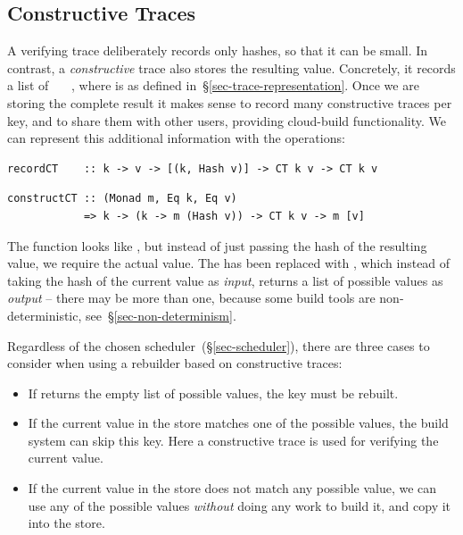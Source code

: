 \subsection{Constructive Traces}\label{sec-constructive-traces}

A verifying trace deliberately records only hashes, so that it can be small. In
contrast, a \emph{constructive} trace also stores the resulting value.
Concretely, it records a list of ~~~, where
 is as defined in~\S\ref{sec-trace-representation}. Once we are
storing the complete result it makes sense to record many constructive traces
per key, and to share them with other users, providing cloud-build
functionality. We can represent this additional information with the operations:

\vspace{1mm}
\begin{verbatim}
recordCT    :: k -> v -> [(k, Hash v)] -> CT k v -> CT k v
\end{verbatim}
\vspace{-2mm}
\begin{verbatim}
constructCT :: (Monad m, Eq k, Eq v)
            => k -> (k -> m (Hash v)) -> CT k v -> m [v]
\end{verbatim}
\vspace{1mm}

\noindent
The function  looks like , but instead of just passing
the hash of the resulting value, we require the actual value. The 
has been replaced with , which instead of taking the hash of the
current value as \emph{input}, returns a list of possible values as
\emph{output} -- there may be more than one, because some build tools are
non-deterministic, see~\S\ref{sec-non-determinism}.

Regardless of the chosen scheduler~(\S\ref{sec-scheduler}), there are three
cases to consider when using a rebuilder based on constructive traces:

\begin{itemize}
  \item If  returns the empty list of possible values, the key
        must be rebuilt.
  \item If the current value in the store matches one of the possible values,
        the build system can skip this key. Here a constructive trace is used
        for verifying the current value.
  \item If the current value in the store does not match any possible value, we
        can use any of the possible values \emph{without} doing any work to
        build it, and copy it into the store.
\end{itemize}

